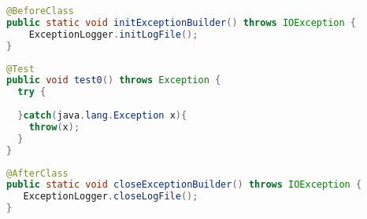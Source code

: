 
\begin{lstlisting}[language=java]
@BeforeClass
public static void initExceptionBuilder() throws IOException {
	ExceptionLogger.initLogFile();
}
\end{lstlisting}

\begin{lstlisting}[language=java]
@Test
public void test0() throws Exception {
  try {
  			
  }catch(java.lang.Exception x){							             	ExceptionsLogger.logException(x);
  	throw(x);
  }
}
\end{lstlisting}

\begin{lstlisting}[language=java]
@AfterClass
public static void closeExceptionBuilder() throws IOException {
   ExceptionLogger.closeLogFile();
}
\end{lstlisting}

